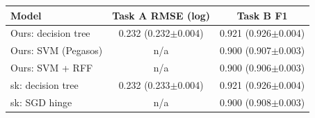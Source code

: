 \begin{tabular}{@{}lcc@{}}
\toprule
Model & Task A RMSE (log) & Task B F1 \\
\midrule
Ours: decision tree & 0.232 (0.232$\pm$0.004) & 0.921 (0.926$\pm$0.004) \\
Ours: SVM (Pegasos) & n/a & 0.900 (0.907$\pm$0.003) \\
Ours: SVM + RFF & n/a & 0.900 (0.906$\pm$0.003) \\
sk: decision tree & 0.232 (0.233$\pm$0.004) & 0.921 (0.926$\pm$0.004) \\
sk: SGD hinge & n/a & 0.900 (0.908$\pm$0.003) \\
\bottomrule
\end{tabular}
